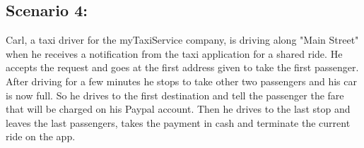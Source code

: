 \subsection{Scenario 4:}
Carl, a taxi driver for the myTaxiService company, is driving along "Main Street" when he receives a notification from the taxi application for a shared ride. He accepts the request and goes at the first address given to take the first passenger. After driving for a few minutes he stops to take other two passengers and his car is now full. So he drives to the first destination and tell the passenger the fare that will be charged on his Paypal account. Then he drives to the last stop and leaves the last passengers, takes the payment in cash and terminate the current ride on the app.